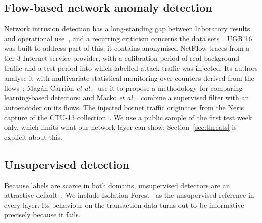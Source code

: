 \subsection{Flow-based network anomaly detection}
Network intrusion detection has a long-standing gap between laboratory results and operational use~\cite{sommer2010,apruzzese2023}, and a recurring criticism concerns the data sets~\cite{ring2019}. UGR'16~\cite{macia2018} was built to address part of this: it contains anonymised NetFlow traces from a tier-3 Internet service provider, with a calibration period of real background traffic and a test period into which labelled attack traffic was injected. Its authors analyse it with multivariate statistical monitoring over counters derived from the flows~\cite{camacho2019}; Mag\'an-Carri\'on \emph{et al.}~\cite{magan2020} use it to propose a methodology for comparing learning-based detectors; and Macko \emph{et al.}~\cite{macko2023} combine a supervised filter with an autoencoder on its flows. The injected botnet traffic originates from the Neris capture of the CTU-13 collection~\cite{garcia2014}. We use a public sample of the first test week only, which limits what our network layer can show; Section~\ref{sec:threats} is explicit about this.

\subsection{Unsupervised detection}
Because labels are scarce in both domains, unsupervised detectors are an attractive default~\cite{chandola2009,akoglu2015}. We include Isolation Forest~\cite{liu2008} as the unsupervised reference in every layer. Its behaviour on the transaction data turns out to be informative precisely because it fails.
